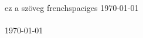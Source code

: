\documentclass{article}
\begin{document}
\frenchspacing
ez a szöveg frenchspaciges
\today
\\
\blindtext
\\
\blindtext
\today
\\
\end{document}
